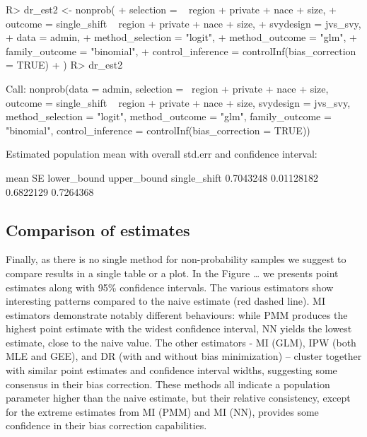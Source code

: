 \documentclass[
]{jss}
\begin{document}
\begin{CodeChunk}
\begin{CodeInput}
R> dr_est2 <- nonprob(
+   selection = ~ region + private + nace + size,
+   outcome = single_shift ~ region + private + nace + size,
+   svydesign = jvs_svy,
+   data = admin,
+   method_selection = "logit",
+   method_outcome = "glm",
+   family_outcome = "binomial",
+   control_inference = controlInf(bias_correction = TRUE)
+ )
R> dr_est2
\end{CodeInput}
\begin{CodeOutput}

Call:
nonprob(data = admin, selection = ~region + private + nace + 
    size, outcome = single_shift ~ region + private + nace + 
    size, svydesign = jvs_svy, method_selection = "logit", method_outcome = "glm", 
    family_outcome = "binomial", control_inference = controlInf(bias_correction = TRUE))

Estimated population mean with overall std.err and confidence interval:

                  mean         SE lower_bound upper_bound
single_shift 0.7043248 0.01128182   0.6822129   0.7264368
\end{CodeOutput}
\end{CodeChunk}

\subsection{Comparison of estimates}\label{comparison-of-estimates}

Finally, as there is no single method for non-probability samples we
suggest to compare results in a single table or a plot. In the Figure
\ldots{} we presents point estimates along with 95\% confidence
intervals. The various estimators show interesting patterns compared to
the naive estimate (red dashed line). MI estimators demonstrate notably
different behaviours: while PMM produces the highest point estimate with
the widest confidence interval, NN yields the lowest estimate, close to
the naive value. The other estimators - MI (GLM), IPW (both MLE and
GEE), and DR (with and without bias minimization) -- cluster together
with similar point estimates and confidence interval widths, suggesting
some consensus in their bias correction. These methods all indicate a
population parameter higher than the naive estimate, but their relative
consistency, except for the extreme estimates from MI (PMM) and MI (NN),
provides some confidence in their bias correction capabilities.
\end{document}
